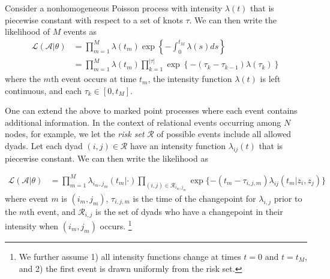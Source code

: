 \documentclass[11pt]{article}
\begin{document}
Consider a nonhomogeneous Poisson process with  intensity $\lambda(t)$ that is piecewise constant with respect to a set of knots $\tau$.  We can then write the likelihood of $M$ events as
\begin{align}
\mathcal{L}(\mathcal{A}|\theta) &= \prod_{m=1}^M \lambda(t_m) \exp\left\{ - \int_{0}^{t_M} \lambda(s)ds \right\} \\
&= \prod_{m=1}^M \lambda(t_m) \prod_{k=1}^{|\tau|} \exp\left\{ - (\tau_{k} - \tau_{k-1}) \lambda(\tau_k) \right\}
\end{align}
\noindent where the $m$th event occurs at time $t_m$, the intensity function $\lambda(t)$ is left continuous, and each $\tau_k \in [0,t_M]$.

One can extend the above to marked point processes where each event contains additional information.  In the context of relational events occurring among $N$ nodes, for example, we let the \emph{risk set} $\mathcal{R}$ of possible events include all allowed dyads.  Let each dyad $(i,j) \in \mathcal{R}$ have an intensity function $\lambda_{ij}(t)$ that is piecewise constant.  We can then write the likelihood as  

\begin{align}
\mathcal{L}(\mathcal{A}|\theta) &= \prod_{m=1}^M \lambda_{i_m,j_m}(t_m|\cdot) \prod_{(i,j) \in \mathcal{R}_{i_m,j_m}}\exp\{ - (t_m - \tau_{i,j,m}) \lambda_{ij}(t_m | z_i,z_j) \}
\end{align}
\noindent where event $m$ is $(i_m,j_m)$, $\tau_{i,j,m}$ is the time  of the changepoint for $\lambda_{i,j}$ prior to the $m$th event, and $\mathcal{R}_{i,j}$ is the set of dyads who have a changepoint in their intensity when $(i_m,j_m)$ occurs. \footnote{We further assume 1) all intensity functions change at times $t=0$ and $t=t_M$, and 2) the first event is drawn uniformly from the risk set.}
\end{document}
